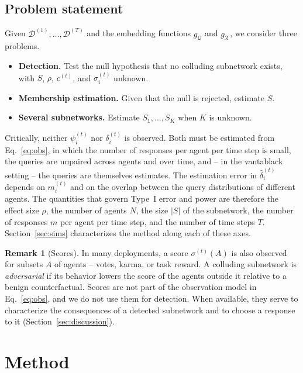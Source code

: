 \documentclass{article}
\theoremstyle{plain}
\theoremstyle{definition}
\newtheorem{remark}{Remark}
\newcommand{\Q}{\mathcal{Q}}
\newcommand{\X}{\mathcal{X}}
\newcommand{\D}{\mathcal{D}}
\begin{document}
\subsection{Problem statement}
\label{sec:problem}

Given $\D^{(1)},\dots,\D^{(T)}$ and the embedding functions $g_\Q$ and $g_\X$, we consider three problems.

\begin{itemize}
  \item[\textbf{P0}] \textbf{Detection.} Test the null hypothesis that no colluding subnetwork exists, with $S$, $\rho$, $c^{(t)}$, and $\sigma_i^{(t)}$ unknown.
  \item[\textbf{P1}] \textbf{Membership estimation.} Given that the null is rejected, estimate $S$.
  \item[\textbf{P2}] \textbf{Several subnetworks.} Estimate $S_1,\dots,S_K$ when $K$ is unknown.
\end{itemize}

Critically, neither $\psi_i^{(t)}$ nor $\delta_i^{(t)}$ is observed. Both must be estimated from Eq.~\eqref{eq:obs}, in which the number of responses per agent per time step is small, the queries are unpaired across agents and over time, and -- in the vantablack setting -- the queries are themselves estimates. The estimation error in $\hat\delta_i^{(t)}$ depends on $m_i^{(t)}$ and on the overlap between the query distributions of different agents. The quantities that govern Type~I error and power are therefore the effect size $\rho$, the number of agents $N$, the size $|S|$ of the subnetwork, the number of responses $m$ per agent per time step, and the number of time steps $T$. Section~\ref{sec:sims} characterizes the method along each of these axes.

\begin{remark}[Scores]
In many deployments, a score $\sigma^{(t)}(A)$ is also observed for subsets $A$ of agents -- votes, karma, or task reward. A colluding subnetwork is \emph{adversarial} if its behavior lowers the score of the agents outside it relative to a benign counterfactual. Scores are not part of the observation model in Eq.~\eqref{eq:obs}, and we do not use them for detection. When available, they serve to characterize the consequences of a detected subnetwork and to choose a response to it (Section~\ref{sec:discussion}).
\end{remark}
\section{Method}
\label{sec:method}
\end{document}
